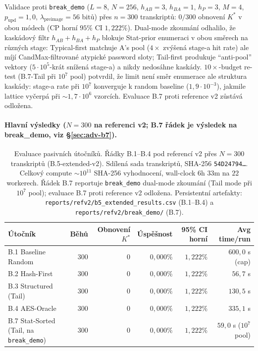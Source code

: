 \documentclass[11pt,a4paper]{article}
\begin{document}
Validace proti \texttt{break\_demo} ($L=8$, $N=256$, $h_{AB}=3$, $h_{BA}=1$, $h_P=3$, $M=4$, $p_\text{upd}=1{,}0$, $\lambda_\text{preimage} = 56$ bitů) přes $n = 300$ transkriptů: $0/300$ obnovení $K^*$ v obou módech (CP horní $95\%$ CI $1{,}222\%$). Dual-mode zkoumání odhalilo, že kaskádový filtr $h_{AB}+h_{BA}+h_P$ blokuje Stat-prior enumeraci v obou směrech na různých stage: Typical-first matchuje A's pool ($4\times$ zvýšená stage-a hit rate) ale míjí CandMax-filtrované atypické password sloty; Tail-first produkuje ``anti-pool'' vektory ($5 \cdot 10^5$-krát snížená stage-a) a nikdy nedosáhne kaskády. $10\times$-budget re-test (B.7-Tail při $10^7$ pool) potvrdil, že limit není směr enumerace ale struktura kaskády: stage-a rate při $10^7$ konverguje k random baseline ($1{,}9 \cdot 10^{-3}$), jakmile lattice vyčerpá při $\sim 1{,}7 \cdot 10^6$ vzorcích. Evaluace B.7 proti reference v2 zůstává odložena.

\paragraph{Hlavní výsledky ($N = 300$ na referenci v2; B.7 řádek je výsledek na break_demo, viz §\ref{sec:adv-b7}).}

\begin{table}[ht]
\centering
\small
\begin{tabular}{lrrrrr}
\toprule
Útočník & Běhů & Obnovení $K^*$ & Úspěšnost & 95\% CI horní & Avg time/run \\
\midrule
B.1 Baseline Random & 300 & 0 & $0{,}000\%$ & $1{,}222\%$ & $600{,}0$ s (cap) \\
B.2 Hash-First & 300 & 0 & $0{,}000\%$ & $1{,}222\%$ & $56{,}7$ s \\
B.3 Structured (Tail) & 300 & 0 & $0{,}000\%$ & $1{,}222\%$ & $130{,}5$ s \\
B.4 AES-Oracle & 300 & 0 & $0{,}000\%$ & $1{,}222\%$ & $335{,}1$ s \\
B.7 Stat-Sorted (Tail, na \texttt{break\_demo}) & 300 & 0 & $0{,}000\%$ & $1{,}222\%$ & $59{,}0$ s ($10^7$ pool) \\
\bottomrule
\end{tabular}
\caption{Evaluace pasivních útočníků. Řádky B.1--B.4 pod referencí v2 přes $N = 300$ transkriptů (B.5-extended-v2). Sdílená sada transkriptů, SHA-256 \texttt{54D24794\ldots}. Celkový compute $\sim 10^{11}$ SHA-256 vyhodnocení, wall-clock $6$h $33$m na $22$ workerech. Řádek B.7 reportuje \texttt{break\_demo} dual-mode zkoumání (Tail mode při $10^7$ pool); evaluace B.7 proti reference v2 odložena. Persistentní artefakty: \texttt{reports/refv2/b5\_extended\_results.csv} (B.1--B.4) a \texttt{reports/refv2/break\_demo/} (B.7).}
\label{tab:attackers}
\end{table}
\end{document}
